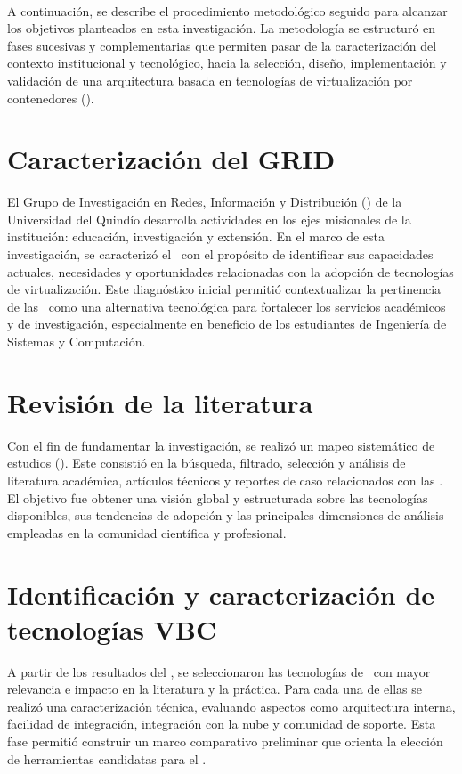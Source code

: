 \label{cap:desarrolloMetodologico}
\mbox{}\\
A continuación, se describe el procedimiento metodológico seguido para alcanzar los objetivos planteados en esta investigación. La metodología se estructuró en fases sucesivas y complementarias que permiten pasar de la caracterización del contexto institucional y tecnológico, hacia la selección, diseño, implementación y validación de una arquitectura basada en tecnologías de virtualización por contenedores (\VBC).

\section{Caracterización del GRID}
\noindent
El Grupo de Investigación en Redes, Información y Distribución (\GRID) de la Universidad del Quindío desarrolla actividades en los ejes misionales de la institución: educación, investigación y extensión. En el marco de esta investigación, se caracterizó el \GRID\ con el propósito de identificar sus capacidades actuales, necesidades y oportunidades relacionadas con la adopción de tecnologías de virtualización. Este diagnóstico inicial permitió contextualizar la pertinencia de las \VBC\ como una alternativa tecnológica para fortalecer los servicios académicos y de investigación, especialmente en beneficio de los estudiantes de Ingeniería de Sistemas y Computación.

\section{Revisión de la literatura}
\noindent
Con el fin de fundamentar la investigación, se realizó un mapeo sistemático de estudios (\SMS). Este consistió en la búsqueda, filtrado, selección y análisis de literatura académica, artículos técnicos y reportes de caso relacionados con las \VBC. El objetivo fue obtener una visión global y estructurada sobre las tecnologías disponibles, sus tendencias de adopción y las principales dimensiones de análisis empleadas en la comunidad científica y profesional.

\section{Identificación y caracterización de tecnologías VBC}
\noindent
A partir de los resultados del \SMS, se seleccionaron las tecnologías de \VBC\ con mayor relevancia e impacto en la literatura y la práctica. Para cada una de ellas se realizó una caracterización técnica, evaluando aspectos como arquitectura interna, facilidad de integración, integración con la nube y comunidad de soporte. Esta fase permitió construir un marco comparativo preliminar que orienta la elección de herramientas candidatas para el \GRID.

